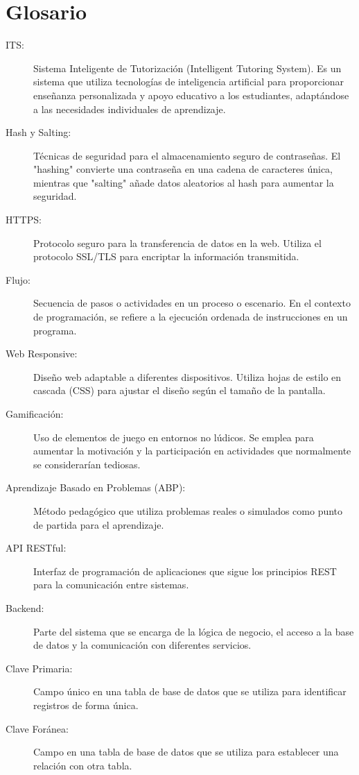 \section*{Glosario} \label{glosario}

\begin{description}
    \item[ITS:] Sistema Inteligente de Tutorización (Intelligent Tutoring System). Es un sistema que utiliza tecnologías de inteligencia artificial para proporcionar enseñanza personalizada y apoyo educativo a los estudiantes, adaptándose a las necesidades individuales de aprendizaje.
    \item[Hash y Salting:] Técnicas de seguridad para el almacenamiento seguro de contraseñas. El "hashing" convierte una contraseña en una cadena de caracteres única, mientras que "salting" añade datos aleatorios al hash para aumentar la seguridad.
    \item[HTTPS:] Protocolo seguro para la transferencia de datos en la web. Utiliza el protocolo SSL/TLS para encriptar la información transmitida.
    \item[Flujo:] Secuencia de pasos o actividades en un proceso o escenario. En el contexto de programación, se refiere a la ejecución ordenada de instrucciones en un programa.
    \item[Web Responsive:] Diseño web adaptable a diferentes dispositivos. Utiliza hojas de estilo en cascada (CSS) para ajustar el diseño según el tamaño de la pantalla.
    \item[Gamificación:] Uso de elementos de juego en entornos no lúdicos. Se emplea para aumentar la motivación y la participación en actividades que normalmente se considerarían tediosas.
    \item[Aprendizaje Basado en Problemas (ABP):] Método pedagógico que utiliza problemas reales o simulados como punto de partida para el aprendizaje.
    \item[API RESTful:] Interfaz de programación de aplicaciones que sigue los principios REST para la comunicación entre sistemas.
    \item[Backend:] Parte del sistema que se encarga de la lógica de negocio, el acceso a la base de datos y la comunicación con diferentes servicios.
    \item[Clave Primaria:] Campo único en una tabla de base de datos que se utiliza para identificar registros de forma única.
    \item[Clave Foránea:] Campo en una tabla de base de datos que se utiliza para establecer una relación con otra tabla.

\end{description}
